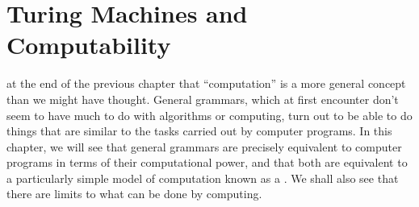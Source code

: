 \chapter{Turing Machines and Computability}\label{C-turing}

\renewcommand{\b}{{\tt\#}}
\newcommand{\at}{{\tt\char`\@}}

 at the end of the previous chapter that
``computation'' is a more general concept than we might have thought.
General grammars, which at first encounter don't seem to have much
to do with algorithms or computing, turn out to be able to do things
that are similar to the tasks carried out by computer programs.
In this chapter, we will see that general grammars are precisely
equivalent to computer programs in terms of their computational
power, and that both are equivalent to a particularly simple model
of computation known as a .  We shall also see
that there are limits to what can be done by computing.
















